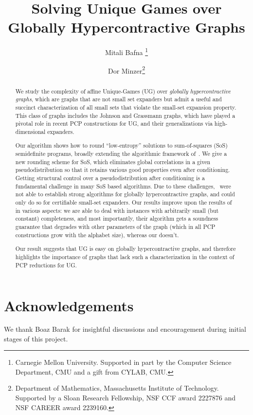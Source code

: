 \documentclass[11pt]{article}
\title{Solving Unique Games over Globally Hypercontractive Graphs}
\author{	Mitali Bafna \thanks{Carnegie Mellon University. Supported in part by the Computer Science Department, CMU and a gift from CYLAB, CMU.}
\and
	Dor Minzer\thanks{Department of Mathematics, Massachusetts Institute of Technology. Supported by a Sloan Research Fellowship, NSF CCF award 2227876 and NSF CAREER award 2239160.}}
\date{\vspace{-5ex}}
\theoremstyle{definition}
\begin{document}
\maketitle

\begin{abstract}
We study the complexity of affine Unique-Games (UG) over 
\emph{globally hypercontractive graphs}, which are graphs that are not small set expanders but admit a useful and succinct characterization of all small sets that violate the small-set expansion property. This class of graphs includes the Johnson and Grassmann graphs, which have played a pivotal role in recent PCP constructions for UG, and their generalizations via high-dimensional expanders.

Our algorithm shows how to round ``low-entropy'' solutions to sum-of-squares (SoS) semidefinite programs, broadly extending the algorithmic framework of~\cite{BBKSS}. 
We give a new rounding scheme for SoS, which eliminates global correlations in a 
given pseudodistribution so that it retains 
various good properties even after conditioning. 
Getting structural control
over a pseudodistribution after conditioning is a 
fundamental challenge in many SoS based 
algorithms. Due to these challenges,~\cite{BBKSS} 
were not able to establish 
strong algorithms for globally 
hypercontractive graphs, and could only
do so for certifiable small-set expanders. 
Our results improve upon the results 
of~\cite{BBKSS} in various aspects: 
we are able to deal with instances with arbitrarily small (but constant) completeness, and most importantly, 
their algorithm gets a soundness 
guarantee that degrades with other 
 parameters of the graph (which in all PCP constructions grow with the alphabet size), whereas our doesn't.


Our result suggests that UG is easy 
on globally hypercontractive graphs, and therefore highlights the importance of graphs that lack such a characterization in the context of PCP reductions for UG.
\end{abstract}








\section*{Acknowledgements}
We thank Boaz Barak for insightful discussions and encouragement during initial stages of this project. 




\appendix



\end{document}
